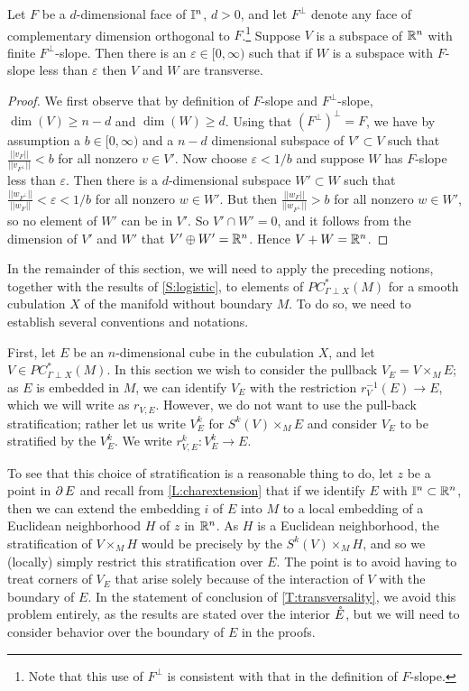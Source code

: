 \begin{lemma}\label{L:complementaryslopes}
	Let $F$ be a $d$-dimensional face of $\mathbb{I}^n$, $d>0$, and let $F^\perp$ denote any face of complementary dimension orthogonal to $F$.\footnote{Note that this use of $F^\perp$ is consistent with that in the definition of $F$-slope.}
	Suppose $V$ is a subspace of $\mathbb{R}^n$ with finite $F^\perp$-slope.
	Then there is an $\varepsilon \in [0,\infty)$ such that if $W$ is a subspace with $F$-slope less than $\varepsilon$ then $V$ and $W$ are transverse.
\end{lemma}
\begin{proof}
	We first observe that by definition of $F$-slope and $F^\perp$-slope, $\dim(V) \geq n-d$ and $\dim(W) \geq d$.
	Using that $(F^\perp)^\perp = F$, we have by assumption a $b \in [0,\infty)$ and a $n-d$ dimensional subspace of $V' \subset V$ such that $\frac{||v_{F}||}{||v_{F^\perp}||} <b$ for all nonzero $v \in V'$.
	Now choose $\varepsilon < 1/b$ and suppose $W$ has $F$-slope less than $\varepsilon$.
	Then there is a $d$-dimensional subspace $W' \subset W$ such that $\frac{|| w_{F^\perp}||}{||w_{F}||} < \varepsilon < 1/b$ for all nonzero $w \in W'$.
	But then $\frac{|| w_{F}||}{||w_{F^\perp}||} > b$ for all nonzero $w \in W'$, so no element of $W'$ can be in $V'$.
	So $V' \cap W' = 0$, and it follows from the dimension of $V'$ and $W'$ that $V' \oplus W' = \mathbb{R}^n$.
	Hence $V + W = \mathbb{R}^n$.
\end{proof}

In the remainder of this section, we will need to apply the preceding notions, together with the results of \cref{S:logistic}, to elements of $PC_{\Gamma \perp X}^*(M)$ for a smooth cubulation $X$ of the manifold without boundary $M$.
To do so, we need to establish several conventions and notations.

First, let $E$ be an $n$-dimensional cube in the cubulation $X$, and let $V \in PC_{\Gamma \perp X}^*(M)$.
In this section we wish to consider the pullback $V_E = V \times_M E$; as $E$ is embedded in $M$, we can identify $V_E$ with the restriction $r_V^{-1}(E) \to E$, which we will write as $r_{V,E}$.
However, we do not want to use the pull-back stratification; rather let us write $V_E^k$ for $S^k(V) \times_M E$ and consider $V_E$ to be stratified by the $V_E^k$.
We write $r_{V,E}^k \colon V_E^k \to E$.

To see that this choice of stratification is a reasonable thing to do, let $z$ be a point in $\operatorname{\partial} E$ and recall from \cref{L:charextension} that if we identify $E$ with $\mathbb{I}^n \subset \mathbb{R}^n$, then we can extend the embedding $i$ of $E$ into $M$ to a local embedding of a Euclidean neighborhood $H$ of $z$ in $\mathbb{R}^n$.
As $H$ is a Euclidean neighborhood, the stratification of $V \times_M H$ would be precisely by the $S^k(V) \times_M H$, and so we (locally) simply restrict this stratification over $E$.
The point is to avoid having to treat corners of $V_E$ that arise solely because of the interaction of $V$ with the boundary of $E$.
In the statement of conclusion of \cref{T:transversality}, we avoid this problem entirely, as the results are stated over the interior $\mathring{E}$, but we will need to consider behavior over the boundary of $E$ in the proofs.

